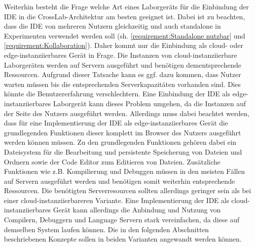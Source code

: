 Weiterhin besteht die Frage welche Art eines Laborgeräts für die Einbindung der IDE in die CrossLab-Architektur am besten geeignet ist. Dabei ist zu beachten, dass die IDE von mehreren Nutzern gleichzeitig und auch standalone in Experimenten verwendet werden soll (sh. \autoref{requirement:Standalone nutzbar} und \autoref{requirement:Kollaboration}). Daher kommt nur die Einbindung als cloud- oder edge-instanziierbares Gerät in Frage. Die Instanzen von cloud-instanziierbare Laborgeräten werden auf Servern ausgeführt und benötigen dementsprechende Ressourcen. Aufgrund dieser Tatsache kann es ggf. dazu kommen, dass Nutzer warten müssen bis die entsprechenden Serverkapazitäten vorhanden sind. Dies könnte die Benutzererfahrung verschlechtern. Eine Einbindung der IDE als edge-instanziierbares Laborgerät kann dieses Problem umgehen, da die Instanzen auf der Seite des Nutzers ausgeführt werden. Allerdings muss dabei beachtet werden, dass für eine Implementierung der IDE als edge-instanziierbares Gerät die grundlegenden Funktionen dieser komplett im Browser des Nutzers ausgeführt werden können müssen. Zu den grundlegenden Funktionen gehören dabei ein Dateisystem für die Bearbeitung und persistente Speicherung von Dateien und Ordnern sowie der Code Editor zum Editieren von Dateien. Zusätzliche Funktionen wie z.B. Kompilierung und Debuggen müssen in den meisten Fällen auf Servern ausgeführt werden und benötigen somit weiterhin entsprechende Ressourcen. Die benötigten Serverresourcen sollten allerdings geringer sein als bei einer cloud-instanziierbareren Variante. Eine Implementierung der IDE als cloud-instanziierbares Gerät kann allerdings die Anbindung und Nutzung von Compilern, Debuggern und Language Servern stark vereinfachen, da diese auf demselben System laufen können. Die in den folgenden Abschnitten beschriebenen Konzepte sollen in beiden Varianten angewandt werden können.
